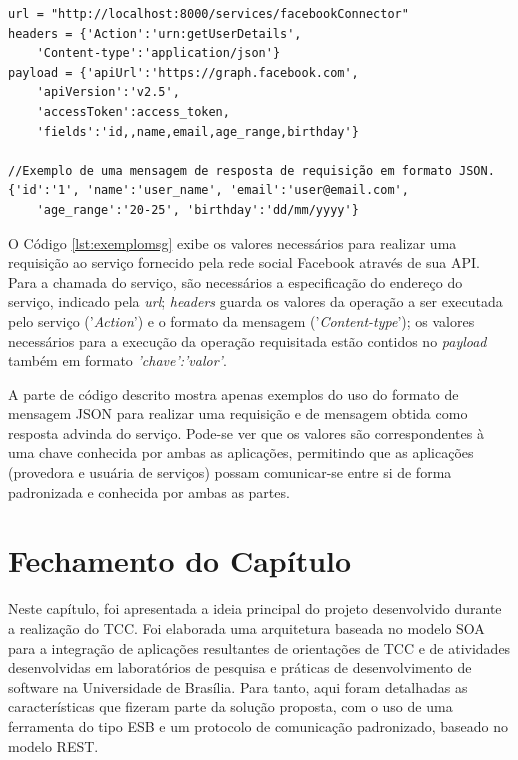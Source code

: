 \begin{lstlisting}[caption={Exemplo de uma mensagem de requisição de serviço em formato JSON de uma aplicação usuário.},label={lst:exemplomsg}]
url = "http://localhost:8000/services/facebookConnector"
headers = {'Action':'urn:getUserDetails', 
	'Content-type':'application/json'}
payload = {'apiUrl':'https://graph.facebook.com', 
	'apiVersion':'v2.5',
	'accessToken':access_token,
	'fields':'id,,name,email,age_range,birthday'}

//Exemplo de uma mensagem de resposta de requisição em formato JSON.
{'id':'1', 'name':'user_name', 'email':'user@email.com', 
	'age_range':'20-25', 'birthday':'dd/mm/yyyy'}
\end{lstlisting}

O Código \ref{lst:exemplomsg} exibe os valores necessários para realizar uma requisição ao serviço fornecido pela rede social Facebook através de sua API. Para a chamada do serviço, são necessários a especificação do endereço do serviço, indicado pela \textit{url}; \textit{headers} guarda os valores da operação a ser executada pelo serviço ('\textit{Action}') e o formato da mensagem ('\textit{Content-type}'); os valores necessários para a execução da operação requisitada estão contidos no \textit{payload} também em formato \textit{{'chave':'valor'}}.

A parte de código descrito mostra apenas exemplos do uso do formato de mensagem JSON para realizar uma requisição e de mensagem obtida como resposta advinda do serviço. Pode-se ver que os valores são correspondentes à uma chave conhecida por ambas as aplicações, permitindo que as aplicações (provedora e usuária de serviços) possam comunicar-se entre si de forma padronizada e conhecida por ambas as partes.

\section{Fechamento do Capítulo}
Neste capítulo, foi apresentada a ideia principal do projeto desenvolvido durante a realização do TCC. Foi elaborada uma arquitetura baseada no modelo SOA para a integração de aplicações resultantes de orientações de TCC e de atividades  desenvolvidas em laboratórios de pesquisa e práticas de desenvolvimento de software na Universidade de Brasília. Para tanto, aqui foram detalhadas as características que fizeram parte da solução proposta, com o uso de uma ferramenta do tipo ESB e um protocolo de comunicação padronizado, baseado no modelo REST.

